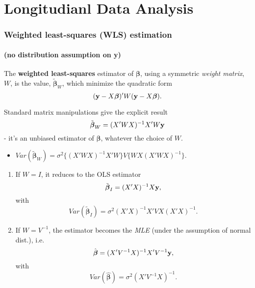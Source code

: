\documentclass[]{article}
\author{}
\date{}
\begin{document}
\section{Longitudianl Data Analysis}\label{longitudianl-data-analysis}

\subsubsection{Weighted least-squares (WLS)
estimation}\label{weighted-least-squares-wls-estimation}

\paragraph{(no distribution assumption on
y)}\label{no-distribution-assumption-on-y}

The \textbf{weighted least-squares} estimator of $\boldsymbol{\beta}$,
using a symmetric \emph{weight matrix}, $W$, is the value,
$\tilde{\boldsymbol{\beta}}_W$, which minimize the quadratic form
\[({\bf y}-X\boldsymbol{\beta})'W({\bf y}-X\boldsymbol{\beta}).\]

Standard matrix manipulations give the explicit result
\[\tilde{\boldsymbol{\beta}}_W=(X'WX)^{-1}X'W{\bf y}\] - it's an
unbiased estimator of $\boldsymbol{\beta}$, whatever the choice of $W$.

\begin{itemize}
\itemsep1pt\parskip0pt
\item
  $Var(\tilde{\boldsymbol{\beta}}_W)=\sigma^2\{(X'WX)^{-1}X'W\}V\{WX(X'WX)^{-1}\}$.
\end{itemize}

\begin{enumerate}
\def\labelenumi{\arabic{enumi}.}
\item
  If $W=I$, it reduces to the OLS estimator
  \[\tilde{\boldsymbol{\beta}}_I=(X'X)^{-1}X{\bf y},\] with
  \[Var(\tilde{\boldsymbol{\beta}}_I)=\sigma^2(X'X)^{-1}X'VX(X'X)^{-1}.\]
\item
  If $W=V^{-1}$, the estimator becomes the \emph{MLE} (under the
  assumption of normal dist.), i.e.
  \[\hat{\boldsymbol{\beta}}=(X'V^{-1}X)^{-1}X'V^{-1}{\bf y},\] with
  \[Var(\hat{\boldsymbol{\beta}})=\sigma^2(X'V^{-1}X)^{-1}.\]
\end{enumerate}
\end{document}
